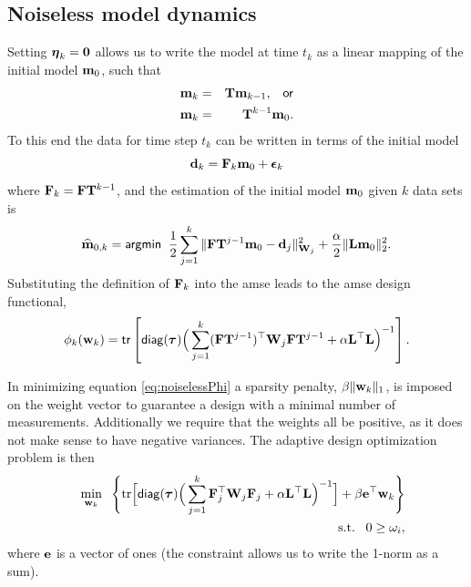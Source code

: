 \documentclass[11pt]{article}
\newcommand{\bfF}	{{\bf{F}}}
\newcommand{\bfL}	{{\bf{L}}}
\newcommand{\bfT}	{{\bf{T}}}
\newcommand{\bfW}	{{\bf{W}}}
\newcommand{\bfd}	{{\bf{d}}}
\newcommand{\bfe}	{{\bf{e}}}
\newcommand{\bfm}	{{\bf{m}}}
\newcommand{\bfw}	{{\bf{w}}}
\newcommand{\hf}        {{\frac 12}}
\newcommand{\bfepsilon} {{\boldsymbol \epsilon}}
\newcommand{\bfeta}     {{\boldsymbol \eta}}
\newcommand{\bftau}      {{\boldsymbol \tau}}
\newcommand{\LtL}       { \bfL^{\top}\bfL}
\newcommand {\zero}  { {\bf 0} }
\renewcommand{\hf}		 {\frac12}
\newcommand{\bfmhat}    {{\widehat{\bfm}}}
\begin{document}
\subsection{Noiseless model dynamics}
Setting $\bfeta_k = \zero$ allows us to write the model at time $t_k$ as a linear mapping of the initial model $\bfm_0$, such that
\begin{eqnarray*}
\bfm_{k} &=& \bfT\bfm_{k-1}, \;\;\;{\sf or } \\
\bfm_{k} &=& \bfT^{k-1}\bfm_0.
\end{eqnarray*} 
To this end the data for time step $t_k$ can be written in terms of the initial model 
\begin{equation}
\bfd_k = \bfF_k\bfm_0 + \bfepsilon_k
\end{equation}
where $\bfF_k = \bfF\bfT^{k-1}$, and the estimation of the initial model $\bfm_0$ given $k$ data sets is 
\begin{equation}
\bfmhat_{0,k} ={\sf argmin } \;\; \hf  \sum_{j=1}^{k}\| \bfF\bfT^{j-1}\bfm_0 - \bfd_j \|_{\bfW_j}^2 + \frac{\alpha}{2}\|\bfL\bfm_0\|_2^2.
\end{equation}
Substituting the definition of $\bfF_k$ into the {\sf amse} leads to the {\sf amse} design functional,
\begin{equation}
\label{eq:noiselessPhi}
\phi_{k}(\bfw_{k}) = {\sf tr} \left[  {\sf diag}(\bftau) \Big(\sum_{j=1}^{k}(\bfF\bfT^{j-1})^{\top}\bfW_{j}\bfF\bfT^{j-1}   +
\alpha \LtL \Big)^{-1} \right] .
\end{equation}

In minimizing equation \eqref{eq:noiselessPhi} a sparsity penalty, $\beta\|\bfw_k\|_1$, is imposed on the weight vector to guarantee a design with a minimal number of measurements. Additionally we require that the weights all be positive, as it does not make sense to have negative variances. The adaptive design optimization problem is then
\begin{eqnarray}
\label{eq:noiselessOpt}
\nonumber
 &&\min_{\bfw_k}\;\;\Bigg \{\text{tr}\Big[ {\sf diag}(\bftau) \Big(\sum_{j=1}^{k}\bfF_{j}^{\top}\bfW_{j}\bfF_{j}   +
\alpha \LtL\Big)^{-1}\Big] + \beta \bfe^{\top}\bfw_k \Bigg \}\\
 &&\text{ s.t.} \;\;\;0 \geq \omega_i,
\end{eqnarray}
where $\bfe$ is a vector of ones (the constraint allows us to write the 1-norm as a sum). 
\end{document}
